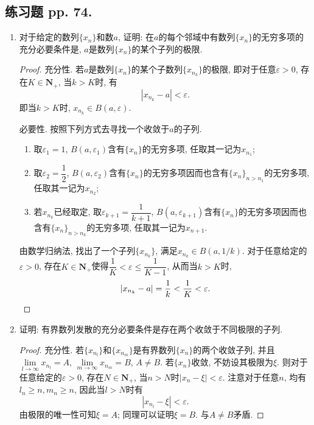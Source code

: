 \documentclass[a4paper,11pt,twoside]{ctexbook}
\begin{document}
\subsection{练习题 pp. 74.}
\begin{enumerate}
	\item 对于给定的数列$\{x_n\}$和数$a$, 证明: 在$a$的每个邻域中有数列$\{x_n\}$的无穷多项的充分必要条件是, $a$是数列$\{x_n\}$的某个子列的极限.
	      \begin{proof}
		      充分性. 若$a$是数列$\{x_n\}$的某个子数列$\{x_{n_k}\}$的极限, 即对于任意$\varepsilon>0$, 存在$K\in\mathbf{N}_{+}$, 当$k>K$时, 有
		      \[
			      |x_{n_k}-a|<\varepsilon.
		      \]
		      即当$k>K$时, $x_{n_k}\in B(a,\varepsilon)$.

		      必要性. 按照下列方式去寻找一个收敛于$a$的子列.
		      \begin{enumerate}[(1)]
			      \item 取$\varepsilon_1=1$, $B(a,\varepsilon_1)$含有$\{x_n\}$的无穷多项, 任取其一记为$x_{n_1}$;
			      \item 取$\varepsilon_2=\dfrac{1}{2}$, $B(a,\varepsilon_2)$含有$\{x_n\}$的无穷多项因而也含有$\{x_n\}_{n>n_1}$的无穷多项, 任取其一记为$x_{n_2}$;
			      \item 若$x_{n_k}$已经取定, 取$\varepsilon_{k+1}=\dfrac{1}{k+1}$, $B(a,\varepsilon_{k+1})$含有$\{x_n\}$的无穷多项因而也含有$\{x_n\}_{n>n_k}$的无穷多项, 任取其一记为$x_{n+1}$.
		      \end{enumerate}
		      由数学归纳法, 找出了一个子列$\{x_{n_k}\}$, 满足$x_{n_k}\in B(a,1/k)$. 对于任意给定的$\varepsilon>0$, 存在$K\in\mathbf{N}_{+}$使得$\dfrac{1}{K}<\varepsilon\leqslant\dfrac{1}{K-1}$, 从而当$k>K$时,
		      \[
			      |x_{n_k}-a|=\dfrac{1}{k}<\dfrac{1}{K}<\varepsilon. \qedhere
		      \]
	      \end{proof}

	\item 证明: 有界数列发散的充分必要条件是存在两个收敛于不同极限的子列.
	      \begin{proof}
		      充分性. 若$\{x_{n_l}\}$和$\{x_{n_m}\}$是有界数列$\{x_n\}$的两个收敛子列, 并且$\lim\limits_{l\to\infty} x_{n_l}=A$, $\lim\limits_{m\to\infty} x_{n_m}=B$, $A\neq B$. 若$\{x_n\}$收敛, 不妨设其极限为$\xi$. 则对于任意给定的$\varepsilon>0$, 存在$N\in\mathbf{N}_{+}$, 当$n>N$时$|x_n-\xi|<\varepsilon$. 注意对于任意$n$, 均有$l_n\geqslant n, m_n\geqslant n$, 因此当$l>N$时有
		      \[
			      |x_{n_l}-\xi|<\varepsilon.
		      \]
		      由极限的唯一性可知$\xi=A$; 同理可以证明$\xi=B$. 与$A\neq B$矛盾.


\end{proof}
\end{enumerate}
\end{document}

